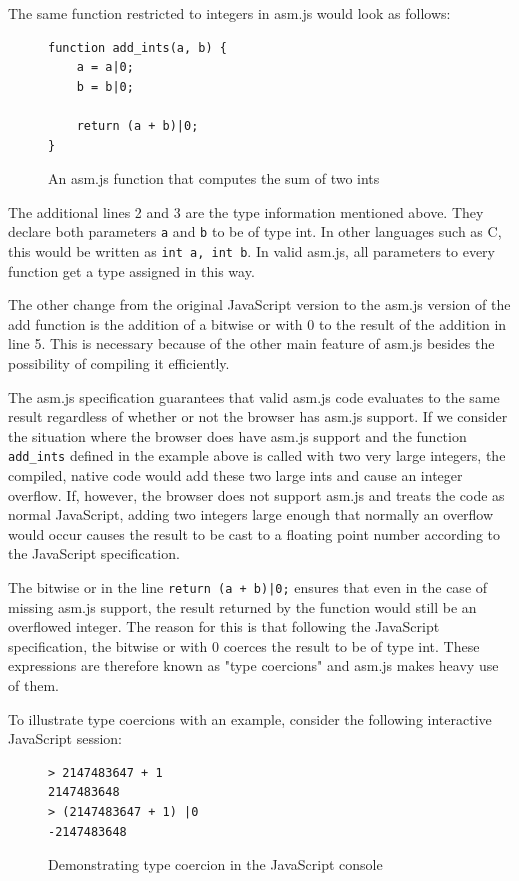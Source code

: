 \documentclass[11pt]{report}
\begin{document}
The same function restricted to integers in asm.js would look as follows:

\begin{figure}[ht]
\begin{lstlisting}
function add_ints(a, b) {
    a = a|0;
    b = b|0;
    
    return (a + b)|0;
}
\end{lstlisting}
\caption{An asm.js function that computes the sum of two ints}
\label{asmjsadder}
\end{figure}

The additional lines 2 and 3 are the type information mentioned above. They declare both parameters \texttt{a} and \texttt{b} to be of type int. In other languages such as C, this would be written as \texttt{int a, int b}. In valid asm.js, all parameters to every function get a type assigned in this way.

The other change from the original JavaScript version to the asm.js version of the add function is the addition of a bitwise or with 0 to the result of the addition in line 5. This is necessary because of the other main feature of asm.js besides the possibility of compiling it efficiently. 

The asm.js specification \cite{asmjsspec} guarantees that valid asm.js code evaluates to the same result regardless of whether or not the browser has asm.js support. If we consider the situation where the browser does have asm.js support and the function \texttt{add_ints} defined in the example above is called with two very large integers, the compiled, native code would add these two large ints and cause an integer overflow. If, however, the browser does not support asm.js and treats the code as normal JavaScript, adding two integers large enough that normally an overflow would occur causes the result to be cast to a floating point number according to the JavaScript specification.

The bitwise or in the line \texttt{return (a + b)|0;} ensures that even in the case of missing asm.js support, the result returned by the function would still be an overflowed integer. The reason for this is that following the JavaScript specification, the bitwise or with 0 coerces the result to be of type int. These expressions are therefore known as "type coercions" and asm.js makes heavy use of them.

To illustrate type coercions with an example, consider the following interactive JavaScript session:

\begin{figure}[ht]
\begin{lstlisting}
> 2147483647 + 1
2147483648
> (2147483647 + 1) |0
-2147483648
\end{lstlisting}
\caption{Demonstrating type coercion in the JavaScript console}
\label{jstypecoercion}
\end{figure}
\end{document}
